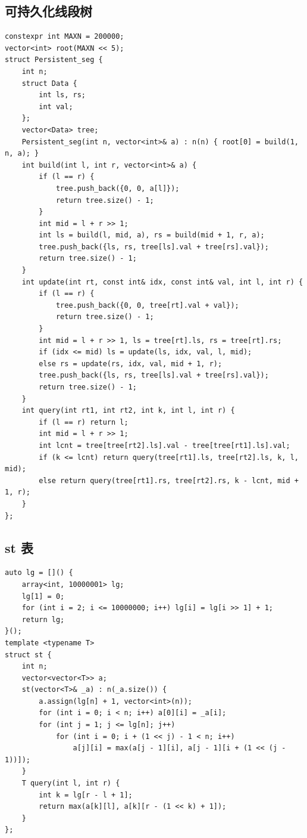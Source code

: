\documentclass[UTF8, twoside]{ctexart}
\begin{document}
\begin{sloppypar}
\subsection{可持久化线段树}

\begin{lstlisting}[style=cpp]
constexpr int MAXN = 200000;
vector<int> root(MAXN << 5);
struct Persistent_seg {
    int n;
    struct Data {
        int ls, rs;
        int val;
    };
    vector<Data> tree;
    Persistent_seg(int n, vector<int>& a) : n(n) { root[0] = build(1, n, a); }
    int build(int l, int r, vector<int>& a) {
        if (l == r) {
            tree.push_back({0, 0, a[l]});
            return tree.size() - 1;
        }
        int mid = l + r >> 1;
        int ls = build(l, mid, a), rs = build(mid + 1, r, a);
        tree.push_back({ls, rs, tree[ls].val + tree[rs].val});
        return tree.size() - 1;
    }
    int update(int rt, const int& idx, const int& val, int l, int r) {
        if (l == r) {
            tree.push_back({0, 0, tree[rt].val + val});
            return tree.size() - 1;
        }
        int mid = l + r >> 1, ls = tree[rt].ls, rs = tree[rt].rs;
        if (idx <= mid) ls = update(ls, idx, val, l, mid);
        else rs = update(rs, idx, val, mid + 1, r);
        tree.push_back({ls, rs, tree[ls].val + tree[rs].val});
        return tree.size() - 1;
    }
    int query(int rt1, int rt2, int k, int l, int r) {
        if (l == r) return l;
        int mid = l + r >> 1;
        int lcnt = tree[tree[rt2].ls].val - tree[tree[rt1].ls].val;
        if (k <= lcnt) return query(tree[rt1].ls, tree[rt2].ls, k, l, mid);
        else return query(tree[rt1].rs, tree[rt2].rs, k - lcnt, mid + 1, r);
    }
};
\end{lstlisting}

\subsection{st 表}

\begin{lstlisting}[style=cpp]
auto lg = []() {
    array<int, 10000001> lg;
    lg[1] = 0;
    for (int i = 2; i <= 10000000; i++) lg[i] = lg[i >> 1] + 1;
    return lg;
}();
template <typename T>
struct st {
    int n;
    vector<vector<T>> a;
    st(vector<T>& _a) : n(_a.size()) {
        a.assign(lg[n] + 1, vector<int>(n));
        for (int i = 0; i < n; i++) a[0][i] = _a[i];
        for (int j = 1; j <= lg[n]; j++)
            for (int i = 0; i + (1 << j) - 1 < n; i++)
                a[j][i] = max(a[j - 1][i], a[j - 1][i + (1 << (j - 1))]);
    }
    T query(int l, int r) {
        int k = lg[r - l + 1];
        return max(a[k][l], a[k][r - (1 << k) + 1]);
    }
};
\end{lstlisting}


\end{sloppypar}
\end{document}

